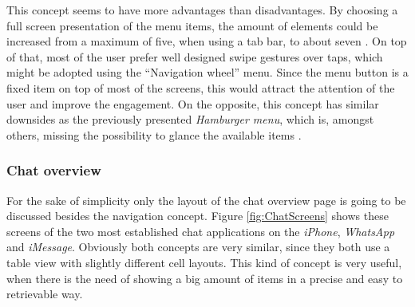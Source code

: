 This concept seems to have more advantages than disadvantages. By choosing a full screen presentation of the menu items, the amount of elements could be increased from a maximum of five, when using a tab bar, to about seven \cite{Crestodina:2015aa}. On top of that, most of the user prefer well designed swipe gestures over taps, which might be adopted using the \enquote{Navigation wheel} menu. Since the menu button is a fixed item on top of most of the screens, this would attract the attention of the user and improve the engagement. On the opposite, this concept has similar downsides as the previously presented \emph{Hamburger menu}, which is, amongst others, missing the possibility to glance the available items \cite{Abreu:2014aa}.

\subsubsection{Chat overview}
\label{sec:ChatOverview}
For the sake of simplicity only the layout of the chat overview page is going to be discussed besides the navigation concept. Figure \vref{fig:ChatScreens} shows these screens of the two most established chat applications on the \emph{iPhone}, \emph{WhatsApp} and \emph{iMessage}. Obviously both concepts are very similar, since they both use a table view with slightly different cell layouts. This kind of concept is very useful, when there is the need of showing a big amount of items in a precise and easy to retrievable way. 

